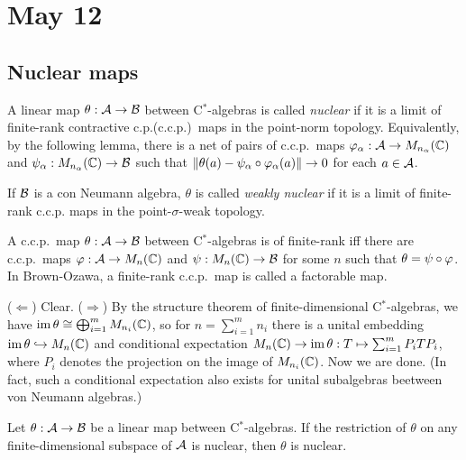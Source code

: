 \documentclass{../../small}
\begin{document}
% 


\newpage
\section{May 12}

\subsection{Nuclear maps}

\begin{defn}
A linear map $\theta:\mathcal{A}\to\mathcal{B}$ between C$^*$-algebras is called \emph{nuclear} if it is a limit of finite-rank contractive c.p.(c.c.p.)~maps in the point-norm topology.
Equivalently, by the following lemma, there is a net of pairs of c.c.p.~maps $\varphi_\alpha:\mathcal{A}\to M_{n_\alpha}(\mathbb{C})$ and $\psi_\alpha:M_{n_\alpha}(\mathbb{C})\to\mathcal{B}$ such that $\|\theta(a)-\psi_\alpha\circ\varphi_\alpha(a)\|\to0$ for each $a\in\mathcal{A}$.

If $\mathcal{B}$ is a con Neumann algebra, $\theta$ is called \emph{weakly nuclear} if it is a limit of finite-rank c.c.p. maps in the point-$\sigma$-weak topology.
\end{defn}

\begin{lem}
A c.c.p.~map $\theta:\mathcal{A}\to\mathcal{B}$ between C$^*$-algebras is of finite-rank iff there are c.c.p.~maps $\varphi:\mathcal{A}\to M_n(\mathbb{C})$ and $\psi:M_n(\mathbb{C})\to\mathcal{B}$ for some $n$ such that $\theta=\psi\circ\varphi$.
In Brown-Ozawa, a finite-rank c.c.p.~map is called a factorable map.
\end{lem}
\begin{pf}
($\Leftarrow$) Clear.
($\Rightarrow$)
By the structure theorem of finite-dimensional C$^*$-algebras, we have $\operatorname{im}\theta\cong\bigoplus_{i=1}^mM_{n_i}(\mathbb{C})$,
so for $n=\sum_{i=1}^mn_i$ there is a unital embedding $\operatorname{im}\theta\hookrightarrow M_n(\mathbb{C})$ and conditional expectation $M_n(\mathbb{C})\to\operatorname{im}\theta:T\mapsto\sum_{i=1}^mP_iTP_i$, where $P_i$ denotes the projection on the image of $M_{n_i}(\mathbb{C})$.
Now we are done.
(In fact, such a conditional expectation also exists for unital subalgebras beetween von Neumann algebras.)
\end{pf}


\begin{prop}
Let $\theta:\mathcal{A}\to\mathcal{B}$ be a linear map between C$^*$-algebras.
If the restriction of $\theta$ on any finite-dimensional subspace of $\mathcal{A}$ is nuclear, then $\theta$ is nuclear.
\end{prop}
\begin{pf}

\end{pf}
\end{document}
